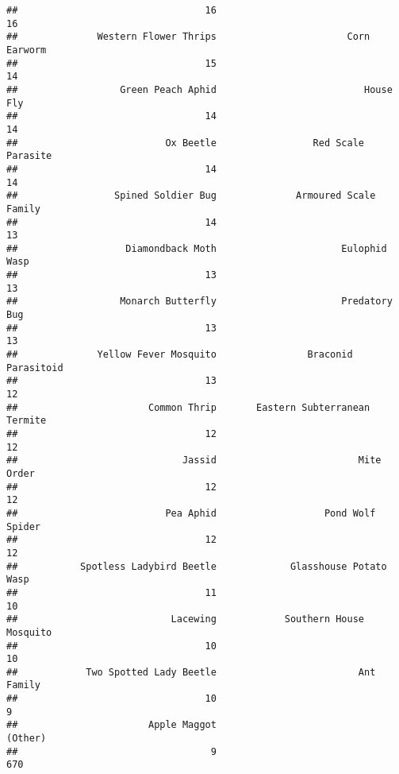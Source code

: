 \documentclass[]{article}
\begin{document}
\begin{verbatim}
##                                 16                                 16 
##              Western Flower Thrips                       Corn Earworm 
##                                 15                                 14 
##                  Green Peach Aphid                          House Fly 
##                                 14                                 14 
##                          Ox Beetle                 Red Scale Parasite 
##                                 14                                 14 
##                 Spined Soldier Bug              Armoured Scale Family 
##                                 14                                 13 
##                   Diamondback Moth                      Eulophid Wasp 
##                                 13                                 13 
##                  Monarch Butterfly                      Predatory Bug 
##                                 13                                 13 
##              Yellow Fever Mosquito                Braconid Parasitoid 
##                                 13                                 12 
##                       Common Thrip       Eastern Subterranean Termite 
##                                 12                                 12 
##                             Jassid                         Mite Order 
##                                 12                                 12 
##                          Pea Aphid                   Pond Wolf Spider 
##                                 12                                 12 
##           Spotless Ladybird Beetle             Glasshouse Potato Wasp 
##                                 11                                 10 
##                           Lacewing            Southern House Mosquito 
##                                 10                                 10 
##            Two Spotted Lady Beetle                         Ant Family 
##                                 10                                  9 
##                       Apple Maggot                            (Other) 
##                                  9                                670
\end{verbatim}
\end{document}
